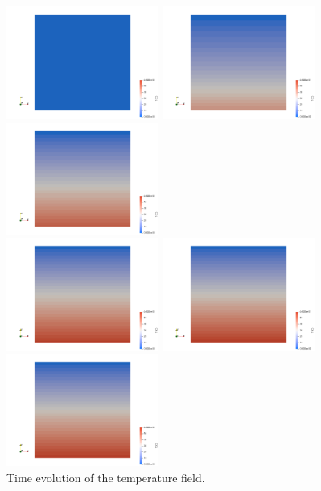 \begin{center}
\includegraphics[width=5cm]{python_codes/fieldstone_141/results/test2/T0000}
\includegraphics[width=5cm]{python_codes/fieldstone_141/results/test2/T0500}
\includegraphics[width=5cm]{python_codes/fieldstone_141/results/test2/T1000}\\
\includegraphics[width=5cm]{python_codes/fieldstone_141/results/test2/T2000}
\includegraphics[width=5cm]{python_codes/fieldstone_141/results/test2/T3000}
\includegraphics[width=5cm]{python_codes/fieldstone_141/results/test2/T4000}\\
{\captionfont Time evolution of the temperature field.}
\end{center}








